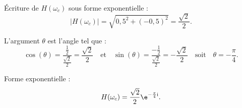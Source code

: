 \medskip

Écriture de $H(\omega_c)$ sous forme exponentielle :
\[|H(\omega_c)| = \sqrt{0,5^2 + (-0,5)^2} = \frac{\sqrt{2}}{2}.\]

L'argument $\theta$ est l'angle tel que :
\[\cos(\theta) = \dfrac{\frac{1}{2}}{\frac{\sqrt{2}}{2}} = \dfrac{\sqrt{2}}{2} \quad \text{et} \quad \sin(\theta) = \dfrac{-\frac{1}{2}}{\frac{\sqrt{2}}{2}} = -\dfrac{\sqrt{2}}{2} \quad \text{soit} \quad \theta = -\dfrac{\pi}{4}.\]

Forme exponentielle :
\[H(\omega_c) = \dfrac{\sqrt{2}}{2} \e^{-\frac{\pi}{4}\text{i}}.\]

\bigskip

